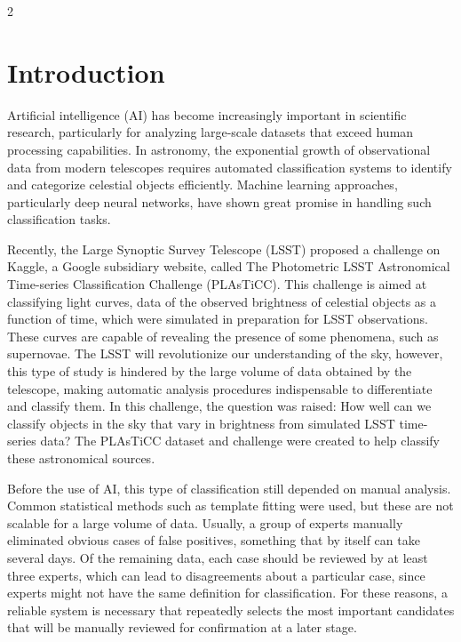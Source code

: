 \documentclass[a4paper,twoside,12pt]{article}
\begin{document}
\vspace{8mm}
\begin{multicols}{2} %
\section{Introduction}
Artificial intelligence (AI) has become increasingly important in scientific research, particularly for analyzing large-scale datasets that exceed human processing capabilities. In astronomy, the exponential growth of observational data from modern telescopes requires automated classification systems to identify and categorize celestial objects efficiently.\cite{Djorgovski_2022} Machine learning approaches, particularly deep neural networks, have shown great promise in handling such classification tasks.

Recently, the Large Synoptic Survey Telescope (LSST) proposed a challenge on Kaggle, a Google subsidiary website, called The Photometric LSST Astronomical Time-series Classification Challenge (PLAsTiCC).\cite{kaggle} This challenge is aimed at classifying light curves, data of the observed brightness of celestial objects as a function of time, which were simulated in preparation for LSST observations. These curves are capable of revealing the presence of some phenomena, such as supernovae\cite{Russel_1912}. The LSST will revolutionize our understanding of the sky, however, this type of study is hindered by the large volume of data obtained by the telescope, making automatic analysis procedures indispensable to differentiate and classify them. In this challenge, the question was raised: How well can we classify objects in the sky that vary in brightness from simulated LSST time-series data? The PLAsTiCC dataset and challenge were created to help classify these astronomical sources. \cite{PLAsTiCC}

Before the use of AI, this type of classification still depended on manual analysis. Common statistical methods such as template fitting\cite{Tanvir_2005} were used, but these are not scalable for a large volume of data. Usually, a group of experts manually eliminated obvious cases of false positives, something that by itself can take several days. Of the remaining data, each case should be reviewed by at least three experts, which can lead to disagreements about a particular case, since experts might not have the same definition for classification. For these reasons, a reliable system is necessary that repeatedly selects the most important candidates that will be manually reviewed for confirmation at a later stage.


\end{multicols}
\end{document}
